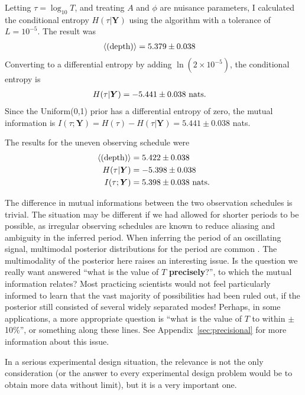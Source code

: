 \documentclass[entropy,article,accept,oneauthor,pdftex,10pt,a4paper]{mdpi}
\newcommand{\depth}{(\textnormal{depth})}
\begin{document}
Letting $\tau = \log_{10} T$, and treating
$A$ and $\phi$ are nuisance parameters, I calculated the conditional entropy
$H(\tau | \boldsymbol{Y})$ using the algorithm with a tolerance of $L = 10^{-5}$.
The result was
\begin{align}
\left<\depth\right> &= 5.379 \pm 0.038
\end{align}
Converting to a differential entropy by adding $\ln (2 \times 10^{-5})$, the conditional
entropy is
\begin{align}
H(\tau | \boldsymbol{Y}) &= -5.441 \pm 0.038 \textnormal{ nats}.
\end{align}
Since the Uniform(0,1) prior has a differential entropy of zero, the
mutual information is $I(\tau; \boldsymbol{Y}) = H(\tau) - H(\tau | \boldsymbol{Y}) = 5.441 \pm 0.038$
nats.

The results for the uneven observing schedule were
\begin{align}
\left<\depth\right>       &=  5.422 \pm 0.038 \\
H(\tau | \boldsymbol{Y}) &= -5.398 \pm 0.038 \\
I(\tau; \boldsymbol{Y})   &=  5.398 \pm 0.038 \textnormal{ nats}.
\end{align}

The difference in mutual informations between the two observation
schedules is trivial.
The situation may be different if we
had allowed for shorter periods to be possible, as irregular observing
schedules are known to reduce aliasing and ambiguity in the inferred period.
When inferring the period of an oscillating signal, multimodal posterior
distributions for the period are common \citep{gregoryTrimodal, exoplanet}.
The multimodality of the posterior here raises an interesting issue. Is
the question we really want answered ``what is the value of $T$
{\bf precisely}?'', to which the mutual information relates?
Most practicing scientists would not feel particularly informed to learn
that the vast majority of possibilities had been ruled out, if the
posterior still consisted of several widely separated modes!
Perhaps, in some applications, a more appropriate question is
``what is the value of $T$ to within $\pm$ 10\%'', or something along these
lines. See Appendix~\ref{sec:precisional} for more information about this
issue.

In a serious experimental design situation, the relevance is not the only
consideration (or the answer to every experimental design problem would
be to obtain more data without limit), but it is a very important one.
\end{document}
